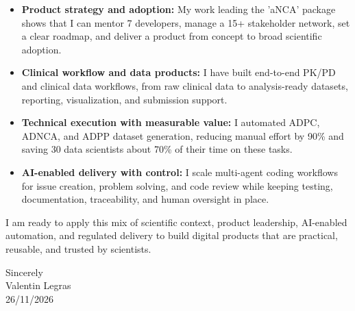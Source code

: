 \documentclass[11pt,a4paper]{article}
\newcommand{\SignDate}{26/11/2026}
\begin{document}
\begin{itemize}
  \item \textbf{Product strategy and adoption:} My work leading the 'aNCA'
        package shows that I can mentor 7 developers, manage a 15+ stakeholder
        network, set a clear roadmap, and deliver a product from concept to
        broad scientific adoption.
  \item \textbf{Clinical workflow and data products:} I have built end-to-end
        PK/PD and clinical data workflows, from raw clinical data to
        analysis-ready datasets, reporting, visualization, and submission
        support.
  \item \textbf{Technical execution with measurable value:} I automated ADPC,
        ADNCA, and ADPP dataset generation, reducing manual effort by 90\% and
        saving 30 data scientists about 70\% of their time on these tasks.
  \item \textbf{AI-enabled delivery with control:} I scale multi-agent coding
        workflows for issue creation, problem solving, and code review while
        keeping testing, documentation, traceability, and human oversight in
        place.
\end{itemize}

I am ready to apply this mix of scientific context, product leadership,
AI-enabled automation, and regulated delivery to build digital products that are
practical, reusable, and trusted by scientists.

\vspace{10pt}
Sincerely\\[6pt]
Valentin Legras\\
\SignDate{}
\end{document}
